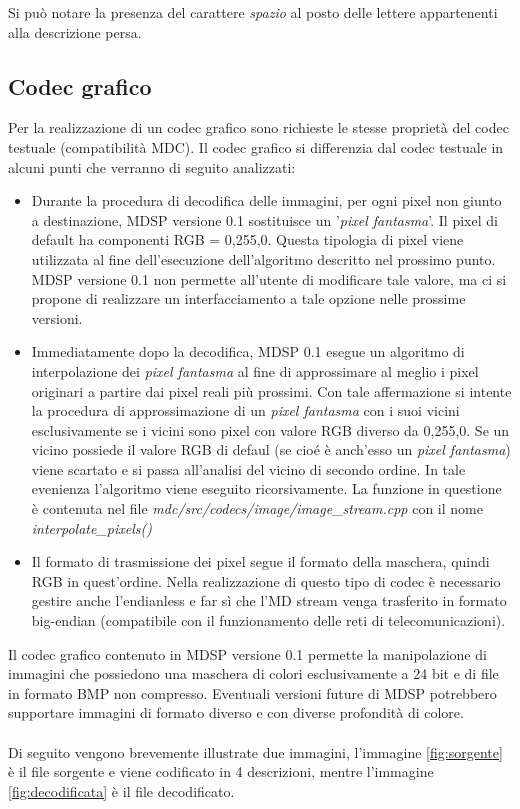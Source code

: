 Si può notare la presenza del carattere \emph{spazio} al posto delle lettere
appartenenti alla descrizione persa.

\subsection{Codec grafico}
Per la realizzazione di un codec grafico sono richieste le stesse proprietà del
codec testuale (compatibilità MDC). Il codec grafico si differenzia dal codec
testuale in alcuni punti che verranno di seguito analizzati:

\begin{itemize}
  \item Durante la procedura di decodifica delle immagini, per ogni pixel
  non giunto a destinazione, MDSP versione 0.1 sostituisce un '\emph{pixel
  fantasma}'. Il pixel di default ha componenti RGB = 0,255,0. Questa
  tipologia di pixel viene utilizzata al fine dell'esecuzione dell'algoritmo
  descritto nel prossimo punto. MDSP versione 0.1 non permette all'utente di
  modificare tale valore, ma ci si propone di realizzare un interfacciamento a tale opzione nelle prossime versioni.
  \item Immediatamente dopo la decodifica, MDSP 0.1 esegue un algoritmo di
  interpolazione dei \emph{pixel fantasma} al fine di approssimare al meglio i
  pixel originari a partire dai pixel reali più prossimi. Con tale affermazione
  si intente la procedura di approssimazione di un \emph{pixel fantasma} con i
  suoi vicini esclusivamente se i vicini sono pixel con valore RGB diverso da
  0,255,0. Se un vicino possiede il valore RGB di defaul (se cioé è anch'esso
  un \emph{pixel fantasma}) viene scartato e si passa all'analisi del vicino di
  secondo ordine. In tale evenienza l'algoritmo viene eseguito ricorsivamente.
  La funzione in questione è contenuta nel file
  \textit{mdc/src/codecs/image/image\_stream.cpp} con il nome
  \textit{interpolate\_pixels()}
  \item Il formato di trasmissione dei pixel segue il formato della maschera,
  quindi RGB in quest'ordine. Nella realizzazione di questo tipo di codec è
  necessario gestire anche l'endianless e far sì che l'MD stream venga
  trasferito in formato big-endian (compatibile con il funzionamento delle reti
  di telecomunicazioni).
\end{itemize}

Il codec grafico contenuto in MDSP versione 0.1 permette la manipolazione di
immagini che possiedono una maschera di colori esclusivamente a 24 bit e di
file in formato BMP non compresso. Eventuali versioni future di MDSP potrebbero
supportare immagini di formato diverso e con diverse profondità di colore.
\\\\
Di seguito vengono brevemente illustrate due immagini, l'immagine
\ref{fig:sorgente} è il file sorgente e viene codificato in 4 descrizioni,
mentre l'immagine \ref{fig:decodificata} è il file decodificato.


